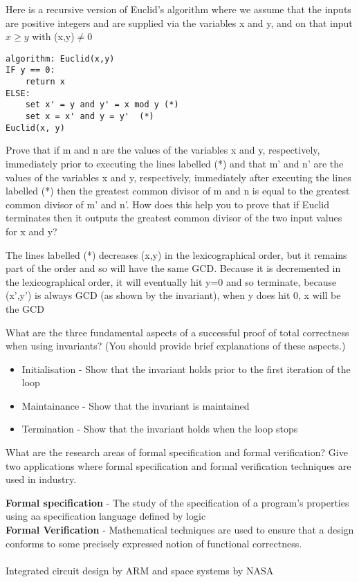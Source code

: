 \documentclass[addpoints]{exam}
\begin{document}
\begin{questions}
\question[8]
Here is a recursive version of Euclid's algorithm where we assume that the inputs are positive integers and are supplied via the variables x and y, and on that input $x\geq y$ with (x,y)$\neq 0$
\begin{lstlisting}
algorithm: Euclid(x,y)
IF y == 0:
	return x
ELSE:
	set x' = y and y' = x mod y (*)
	set x = x' and y = y'  (*)
Euclid(x, y)
\end{lstlisting}
Prove that if m and n are the values of the variables x and y, respectively, immediately prior to executing the lines labelled (*) and that m' and n' are the values of the variables x and y, respectively, immediately
after executing the lines labelled (*) then the greatest common divisor
of m and n is equal to the greatest common divisor of m' and n'. How does this help you to prove that if Euclid terminates then it outputs the greatest common divisor of the two input values for x and y?
\begin{solution}[2in]
	The lines labelled (*) decreases (x,y) in the lexicographical order, but it remains part of the order and so will have the same GCD. Because it is decremented in the lexicographical order, it will eventually hit y=0 and so terminate, because (x',y') is always GCD (as shown by the invariant), when y does hit 0, x will be the GCD
\end{solution}

\question[3]What are the three fundamental aspects of a successful proof of total
correctness when using invariants? (You should provide brief explanations of these aspects.)
\begin{solution}[2in]
\begin{itemize}
	\item Initialisation - Show that the invariant holds prior to the first iteration of the loop
	\item Maintainance - Show that the invariant is maintained
	\item Termination - Show that the invariant holds when the loop stops
\end{itemize}
\end{solution}

\question[4]What are the research areas of formal specification and formal verification? Give two applications where formal specification and formal
verification techniques are used in industry.
\begin{solution}[2in]
	\textbf{Formal specification} - The study of the specification of a program's properties using aa specification language defined by logic\\
	\textbf{Formal Verification} - Mathematical techniques are used to ensure that a design conforms to some precisely expressed notion of functional correctness.\\
	\\
	Integrated circuit design by ARM and space systems by NASA
\end{solution}

\end{questions}

	
	
	
	
\end{document}
